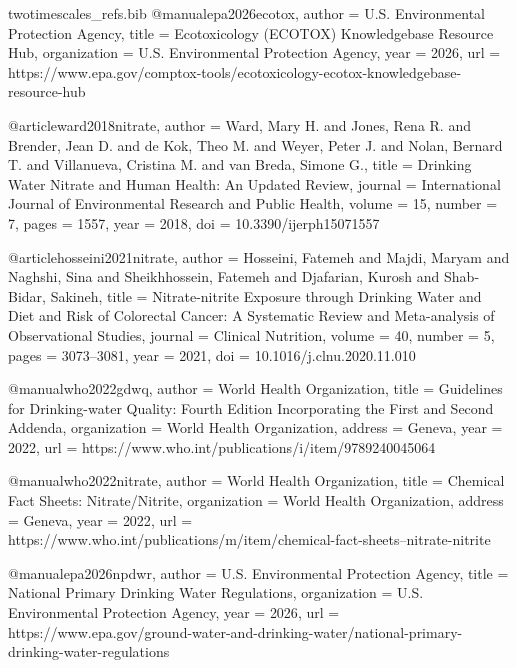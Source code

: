 \begin{filecontents*}{twotimescales_refs.bib}
	@manual{epa2026ecotox,
		author       = {{U.S. Environmental Protection Agency}},
		title        = {Ecotoxicology (ECOTOX) Knowledgebase Resource Hub},
		organization = {U.S. Environmental Protection Agency},
		year         = {2026},
		url          = {https://www.epa.gov/comptox-tools/ecotoxicology-ecotox-knowledgebase-resource-hub}
	}
	
	@article{ward2018nitrate,
		author  = {Ward, Mary H. and Jones, Rena R. and Brender, Jean D. and de Kok, Theo M. and Weyer, Peter J. and Nolan, Bernard T. and Villanueva, Cristina M. and van Breda, Simone G.},
		title   = {Drinking Water Nitrate and Human Health: An Updated Review},
		journal = {International Journal of Environmental Research and Public Health},
		volume  = {15},
		number  = {7},
		pages   = {1557},
		year    = {2018},
		doi     = {10.3390/ijerph15071557}
	}
	
	@article{hosseini2021nitrate,
		author  = {Hosseini, Fatemeh and Majdi, Maryam and Naghshi, Sina and Sheikhhossein, Fatemeh and Djafarian, Kurosh and Shab-Bidar, Sakineh},
		title   = {Nitrate-nitrite Exposure through Drinking Water and Diet and Risk of Colorectal Cancer: A Systematic Review and Meta-analysis of Observational Studies},
		journal = {Clinical Nutrition},
		volume  = {40},
		number  = {5},
		pages   = {3073--3081},
		year    = {2021},
		doi     = {10.1016/j.clnu.2020.11.010}
	}
	
	@manual{who2022gdwq,
		author       = {{World Health Organization}},
		title        = {Guidelines for Drinking-water Quality: Fourth Edition Incorporating the First and Second Addenda},
		organization = {World Health Organization},
		address      = {Geneva},
		year         = {2022},
		url          = {https://www.who.int/publications/i/item/9789240045064}
	}
	
	@manual{who2022nitrate,
		author       = {{World Health Organization}},
		title        = {Chemical Fact Sheets: Nitrate/Nitrite},
		organization = {World Health Organization},
		address      = {Geneva},
		year         = {2022},
		url          = {https://www.who.int/publications/m/item/chemical-fact-sheets--nitrate-nitrite}
	}
	
	@manual{epa2026npdwr,
		author       = {{U.S. Environmental Protection Agency}},
		title        = {National Primary Drinking Water Regulations},
		organization = {U.S. Environmental Protection Agency},
		year         = {2026},
		url          = {https://www.epa.gov/ground-water-and-drinking-water/national-primary-drinking-water-regulations}
	}
	

\end{filecontents*}
